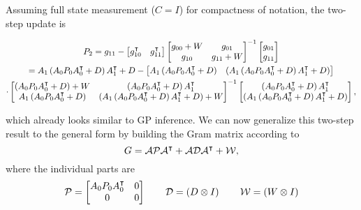 Assuming full state measurement ($C=I$) for compactness of notation, the
two-step update is
\begin{fullwidth}\vspace{-\baselineskip}
\begin{multline}
  P_2 = g_{11}
  - \begin{bmatrix}g_{10}\T & g_{11}\T\end{bmatrix}
    \begin{bmatrix}
  g_{00}+ \NC &
  g_{01}\\
  g_{10}&
  g_{11} + \NC
  \end{bmatrix}\inv
  \begin{bmatrix}g_{01} \\ g_{11}\end{bmatrix}\\
  =
  A_1 \left(A_0 P_0 A_0\T + \DC\right) A_1\T + \DC
  - \begin{bmatrix}A_1 \left(A_0 P_0 A_0\T + \DC\right) &
    \left( A_1 \left(A_0 P_0 A_0\T + \DC\right) A_1\T + \DC \right)\end{bmatrix}
    \\
    \cdot
  \begin{bmatrix}
  \left(A_0 P_0 A_0\T + \DC\right) + \NC &
  \left(A_0 P_0 A_0\T + \DC\right) A_1\T \\
  A_1 \left(A_0 P_0 A_0\T + \DC\right) &
  \left( A_1 \left(A_0 P_0 A_0\T + \DC\right) A_1\T + \DC \right) + \NC
  \end{bmatrix}\inv
  \begin{bmatrix}\left(A_0 P_0 A_0\T + \DC\right) A_1\T \\
  \left( A_1 \left(A_0 P_0 A_0\T + \DC\right) A_1\T + \DC \right)\end{bmatrix},
  \label{eq:twostep-result}
\end{multline}
\end{fullwidth}
which already looks similar to GP inference. We can now generalize this two-step
result to the general form by building the Gram matrix according to
\begin{equation}
  G = \mathcal{A}\mathcal{P}\mathcal{A}^{\intercal} + \mathcal{A}\mathcal{D}\mathcal{A}^{\intercal} + \mathcal{W},
\end{equation}
where the individual parts are
\begin{equation}
    \mathcal{P} = \begin{bmatrix} A_0 P_0 A_0^{\intercal} & 0 \\ 0 & 0 \end{bmatrix} \qquad
    \mathcal{D} = \left(D\otimes I\right) \qquad
    \mathcal{W} = \left(W\otimes I\right)
\end{equation}
